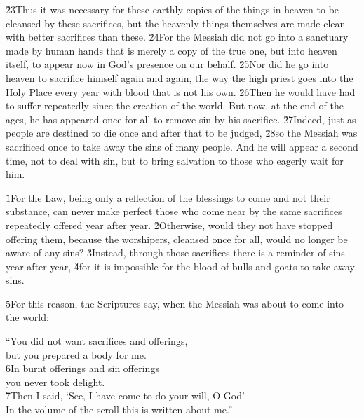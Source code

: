 \v{23}Thus it was necessary for these earthly copies of the things in heaven to be cleansed by these sacrifices, but the heavenly things themselves are made clean with better sacrifices than these. \v{24}For the Messiah did not go into a sanctuary made by human hands that is merely a copy of the true one, but into heaven itself, to appear now in God's presence on our behalf. \v{25}Nor did he go into heaven to sacrifice himself again and again, the way the high priest goes into the Holy Place every year with blood that is not his own. \v{26}Then he would have had to suffer repeatedly since the creation of the world. But now, at the end of the ages, he has appeared once for all to remove sin by his sacrifice. \v{27}Indeed, just as people are destined to die once and after that to be judged, \v{28}so the Messiah was sacrificed once to take away the sins of many people. And he will appear a second time, not to deal with sin, but to bring salvation to those who eagerly wait for him.

\v{1}For the Law, being only a reflection of the blessings to come and not their substance, can never make perfect those who come near by the same sacrifices repeatedly offered year after year. \v{2}Otherwise, would they not have stopped offering them, because the worshipers, cleansed once for all, would no longer be aware of any sins? \v{3}Instead, through those sacrifices there is a reminder of sins year after year, \v{4}for it is impossible for the blood of bulls and goats to take away sins.

\v{5}For this reason, the Scriptures say, when the Messiah was about to come into the world:

\begin{poetry}
\poeml ``You did not want sacrifices and offerings, \\
\poemll    but you prepared a body for me. \\
\poeml \v{6}In burnt offerings and sin offerings \\
\poemll    you never took delight. \\
\poeml \v{7}Then I said, `See, I have come to do your will, O God' \\
\poemll    In the volume of the scroll this is written about me.''
\end{poetry}

